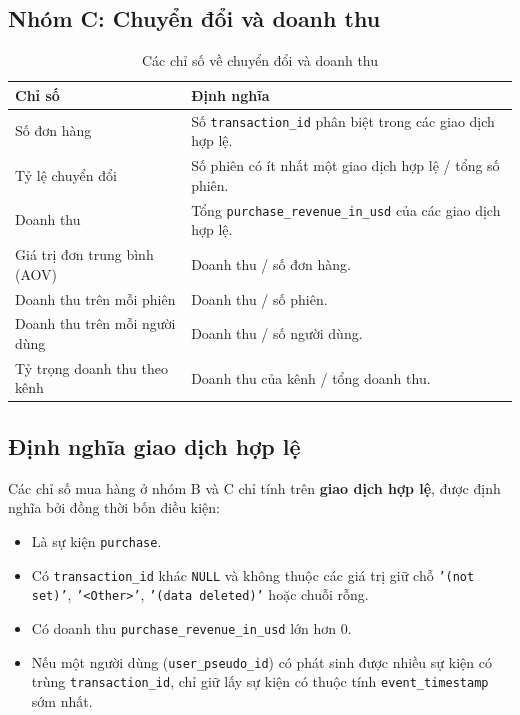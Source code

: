 \subsection*{Nhóm C: Chuyển đổi và doanh thu}

\begin{table}[H]
    \centering
    \renewcommand{\arraystretch}{1.2}
    \caption{Các chỉ số về chuyển đổi và doanh thu}
    \label{tab:revenue_kpi}
    \begin{tabularx}{\textwidth}{
        >{\raggedright\arraybackslash}p{4.2cm}
        >{\raggedright\arraybackslash}X
    }
        \hline
        \textbf{Chỉ số} & \textbf{Định nghĩa} \\
        \hline
        Số đơn hàng &
        Số \texttt{transaction\_id} phân biệt trong các giao dịch hợp lệ. \\

        Tỷ lệ chuyển đổi &
        Số phiên có ít nhất một giao dịch hợp lệ / tổng số phiên. \\

        Doanh thu &
        Tổng \texttt{purchase\_revenue\_in\_usd} của các giao dịch hợp lệ. \\

        Giá trị đơn trung bình (AOV) &
        Doanh thu / số đơn hàng. \\

        Doanh thu trên mỗi phiên &
        Doanh thu / số phiên. \\

        Doanh thu trên mỗi người dùng &
        Doanh thu / số người dùng. \\

        Tỷ trọng doanh thu theo kênh &
        Doanh thu của kênh / tổng doanh thu. \\
        \hline
    \end{tabularx}
\end{table}

\subsection*{Định nghĩa giao dịch hợp lệ}

Các chỉ số mua hàng ở nhóm B và C chỉ tính trên \textbf{giao dịch hợp lệ}, được định nghĩa bởi đồng thời bốn điều kiện:

\begin{itemize}
    \item Là sự kiện \texttt{purchase}.
    \item Có \texttt{transaction\_id} khác \texttt{NULL} và không thuộc các giá trị giữ chỗ \texttt{'(not set)'}, \texttt{'<Other>'}, \texttt{'(data deleted)'} hoặc chuỗi rỗng.
    \item Có doanh thu \texttt{purchase\_revenue\_in\_usd} lớn hơn 0.
    \item Nếu một người dùng (\texttt{user\_pseudo\_id}) có phát sinh được nhiều sự kiện có trùng \texttt{transaction\_id}, chỉ giữ lấy sự kiện có thuộc tính \texttt{event\_timestamp} sớm nhất.
\end{itemize}

